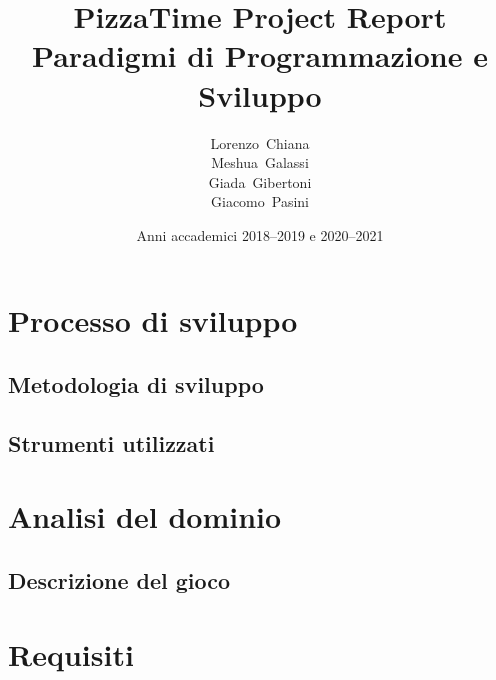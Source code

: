\title{%
    \LARGE{\textbf{PizzaTime Project Report}}\\%
    \large{Paradigmi di Programmazione e Sviluppo}
}

\author{%
    Lorenzo~Chiana\\%
    Meshua~Galassi\\%
    Giada~Gibertoni\\%
    Giacomo~Pasini
}

\date{\small{Anni accademici 2018--2019 e 2020--2021}}



    \maketitle

    \tableofcontents

    \clearpage

    \chapter{Processo di sviluppo}\label{ch:process}
        
        \section{Metodologia di sviluppo}\label{sec:metodology}
            
        \section{Strumenti utilizzati}\label{sec:tools}
            

	\clearpage
	
	\chapter{Analisi del dominio}\label{ch:analisi}
		\section{Descrizione del gioco}\label{sec:gamedescription}
		

    \clearpage

    \chapter{Requisiti}\label{ch:requirements}
        

